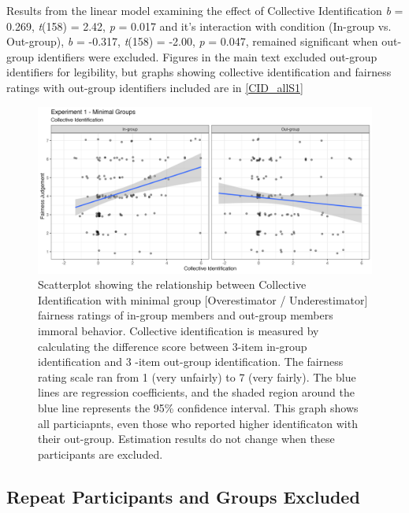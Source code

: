 \documentclass[12pt,]{article}
\begin{document}
\clearpage

Results from the linear model examining the effect of Collective Identification \emph{b} = 0.269, \emph{t}(158) = 2.42, \emph{p} = 0.017 and it's interaction with condition (In-group vs. Out-group), \emph{b} = -0.317, \emph{t}(158) = -2.00, \emph{p} = 0.047, remained significant when out-group identifiers were excluded. Figures in the main text excluded out-group identifiers for legibility, but graphs showing collective identification and fairness ratings with out-group identifiers included are in \cref{CID_allS1}


\begin{figure}
	\centering
	\includegraphics{Plots/Study1_CI_all.png}
	\caption{Scatterplot showing the relationship between Collective Identification with minimal group [Overestimator / Underestimator] fairness ratings of in-group members and out-group members immoral behavior. Collective identification is measured by calculating the difference score between 3-item in-group identification and 3 -item out-group identification. The fairness rating scale ran from 1 (very unfairly) to 7 (very fairly). The blue lines are regression coefficients, and the shaded region around the blue line represents the 95\% confidence interval. This graph shows all particiapnts, even those who reported higher identificaton with their out-group. Estimation results do not change when these participants are excluded. }
	\label{fig:CID_allS1}
\end{figure}



\newpage
\subsection{Repeat Participants and Groups Excluded}
\label{appendix:repeat1}
\end{document}
